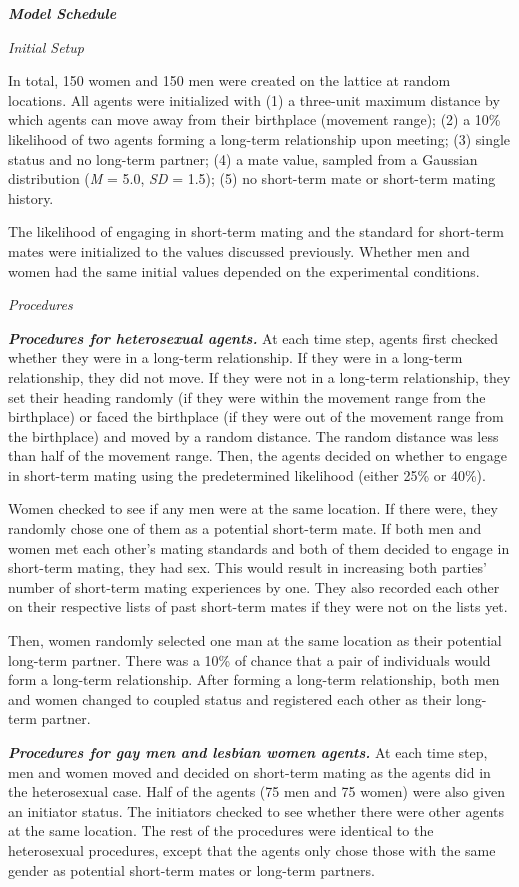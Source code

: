 \documentclass[
  12pt,
]{article}
\begin{document}
\textbf{\emph{Model Schedule}}

\emph{Initial Setup}

In total, 150 women and 150 men were created on the lattice at random
locations. All agents were initialized with (1) a three-unit maximum
distance by which agents can move away from their birthplace (movement
range); (2) a 10\% likelihood of two agents forming a long-term
relationship upon meeting; (3) single status and no long-term partner;
(4) a mate value, sampled from a Gaussian distribution (\emph{M} = 5.0,
\emph{SD} = 1.5); (5) no short-term mate or short-term mating history.

The likelihood of engaging in short-term mating and the standard for
short-term mates were initialized to the values discussed previously.
Whether men and women had the same initial values depended on the
experimental conditions.

\emph{Procedures}

\textbf{\emph{Procedures for heterosexual agents.}} At each time step,
agents first checked whether they were in a long-term relationship. If
they were in a long-term relationship, they did not move. If they were
not in a long-term relationship, they set their heading randomly (if
they were within the movement range from the birthplace) or faced the
birthplace (if they were out of the movement range from the birthplace)
and moved by a random distance. The random distance was less than half
of the movement range. Then, the agents decided on whether to engage in
short-term mating using the predetermined likelihood (either 25\% or
40\%).

Women checked to see if any men were at the same location. If there
were, they randomly chose one of them as a potential short-term mate. If
both men and women met each other's mating standards and both of them
decided to engage in short-term mating, they had sex. This would result
in increasing both parties' number of short-term mating experiences by
one. They also recorded each other on their respective lists of past
short-term mates if they were not on the lists yet.

Then, women randomly selected one man at the same location as their
potential long-term partner. There was a 10\% of chance that a pair of
individuals would form a long-term relationship. After forming a
long-term relationship, both men and women changed to coupled status and
registered each other as their long-term partner.

\textbf{\emph{Procedures for gay men and lesbian women agents.}} At each
time step, men and women moved and decided on short-term mating as the
agents did in the heterosexual case. Half of the agents (75 men and 75
women) were also given an initiator status. The initiators checked to
see whether there were other agents at the same location. The rest of
the procedures were identical to the heterosexual procedures, except
that the agents only chose those with the same gender as potential
short-term mates or long-term partners.
\end{document}
